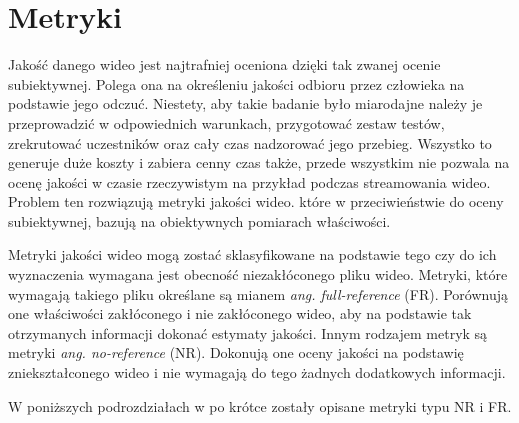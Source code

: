 \section{Metryki}

Jakość danego wideo jest najtrafniej oceniona dzięki tak zwanej ocenie subiektywnej. Polega ona na określeniu jakości odbioru przez człowieka na podstawie jego odczuć. Niestety, aby takie badanie było miarodajne należy je przeprowadzić w odpowiednich warunkach, przygotować zestaw testów, zrekrutować uczestników oraz cały czas nadzorować jego przebieg. Wszystko to generuje duże koszty i zabiera cenny czas także, przede wszystkim nie pozwala na ocenę jakości w czasie rzeczywistym na przykład podczas streamowania wideo. Problem ten rozwiązują metryki jakości wideo. które w przeciwieństwie do oceny subiektywnej, bazują na obiektywnych pomiarach właściwości\cite{vqm}.\par
Metryki jakości wideo mogą zostać sklasyfikowane na podstawie tego czy do ich wyznaczenia wymagana jest obecność niezakłóconego pliku wideo. Metryki, które wymagają takiego pliku określane są mianem {\em ang. full-reference} (FR). Porównują one właściwości zakłóconego i nie zakłóconego wideo, aby na podstawie tak otrzymanych informacji dokonać estymaty jakości. Innym rodzajem metryk są metryki {\em ang. no-reference} (NR). Dokonują one oceny jakości na podstawię zniekształconego wideo i nie wymagają do tego żadnych dodatkowych informacji\cite{vqm}.\par

W poniższych podrozdziałach w po krótce zostały opisane metryki typu NR i FR.


